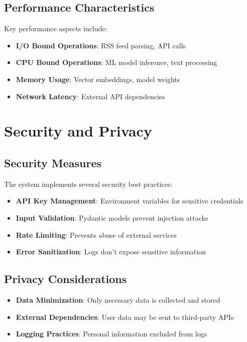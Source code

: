 \subsection{Performance Characteristics}

Key performance aspects include:

\begin{itemize}
\item \textbf{I/O Bound Operations}: RSS feed parsing, API calls
\item \textbf{CPU Bound Operations}: ML model inference, text processing
\item \textbf{Memory Usage}: Vector embeddings, model weights
\item \textbf{Network Latency}: External API dependencies
\end{itemize}

\section{Security and Privacy}

\subsection{Security Measures}

The system implements several security best practices:

\begin{itemize}
\item \textbf{API Key Management}: Environment variables for sensitive credentials
\item \textbf{Input Validation}: Pydantic models prevent injection attacks
\item \textbf{Rate Limiting}: Prevents abuse of external services
\item \textbf{Error Sanitization}: Logs don't expose sensitive information
\end{itemize}

\subsection{Privacy Considerations}

\begin{itemize}
\item \textbf{Data Minimization}: Only necessary data is collected and stored
\item \textbf{External Dependencies}: User data may be sent to third-party APIs
\item \textbf{Logging Practices}: Personal information excluded from logs
\end{itemize}

